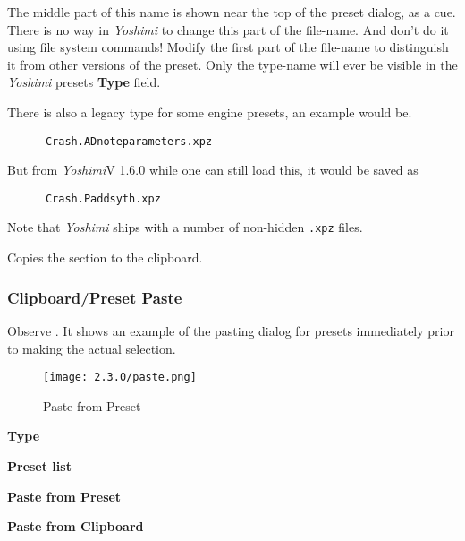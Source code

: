    The middle part of this name is shown near the top of the preset dialog, as
   a cue.
   There is no way in \textsl{Yoshimi} to change this part of the file-name.
   And don't do it using file system commands!  Modify the first part of the
   file-name to distinguish it from other versions of the preset.
   Only the type-name will ever be visible in the \textsl{Yoshimi}
   presets \textbf{Type} field.

   There is also a legacy type for some engine presets, an example would be.
   \begin{verbatim}
      Crash.ADnoteparameters.xpz
   \end{verbatim}
   But from \textsl{Yoshimi}V 1.6.0 while one can still load this, it would be saved as
   \begin{verbatim}
      Crash.Paddsyth.xpz
   \end{verbatim}

   Note that \textsl{Yoshimi} ships with a number of non-hidden \texttt{.xpz}
   files.

   Copies the section to the clipboard.

\subsubsection{Clipboard/Preset Paste}
\label{subsubsec:clipboard_paste}

   Observe .
   It shows an example of the pasting dialog for presets immediately prior to making
   the actual selection.

\begin{figure}[H]
   \centering
   \texttt{[image: 2.3.0/paste.png]}
   \caption[Paste from Preset]{Paste from Preset}
   \label{fig:paste_to_clipboard}
\end{figure}

   \begin{enumber}
      \item \textbf{Type}
      \item \textbf{Preset list}
      \item \textbf{Paste from Preset}
      \item \textbf{Paste from Clipboard}
   \end{enumber}

   \setcounter{ItemCounter}{0}      %


